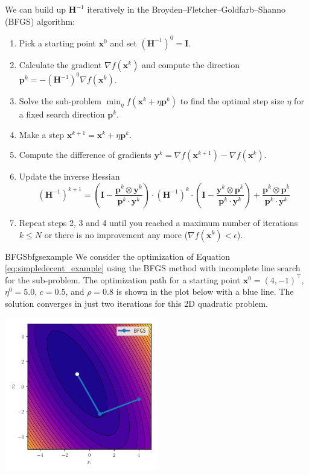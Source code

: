 We can build up $\mathbf{H}^{-1}$ iteratively in the Broyden–Fletcher–Goldfarb–Shanno (BFGS) \cite{Broyden1970, Fletcher1970, Goldfarb1970, Shanno1970} algorithm: 
\begin{enumerate}
    \item Pick a starting point $\mathbf{x}^0$ and set $(\mathbf{H}^{-1})^0=\mathbf{I}$.
    \item Calculate the gradient $\nabla f(\mathbf{x}^k)$ and compute the direction $\mathbf{p}^k = - (\mathbf{H}^{-1})^0 \nabla f(\mathbf{x}^k)$.
    \item Solve the sub-problem $\min_{\eta} f(\mathbf{x}^k + \eta \mathbf{p}^k)$ to find the optimal step size $\eta$ for a fixed search direction $\mathbf{p}^k$.
    \item Make a step $\mathbf{x}^{k+1} = \mathbf{x}^k + \eta \mathbf{p}^k$.
    \item Compute the difference of gradients $ \mathbf{y}^k = \nabla f(\mathbf{x}^{k+1}) - \nabla f(\mathbf{x}^k)$.
    \item Update the inverse Hessian 
    \begin{equation}
        \nonumber
        (\mathbf{H}^{-1})^{k+1} = 
            \left(\mathbf{I} - \frac{\mathbf{p}^k \otimes \mathbf{y}^k}{\mathbf{p}^k \cdot \mathbf{y}^k} \right)
            \cdot
            (\mathbf{H}^{-1})^k
            \cdot
            \left(\mathbf{I} - \frac{\mathbf{y}^k \otimes \mathbf{p}^k}{\mathbf{p}^k \cdot \mathbf{y}^k} \right) 
            + 
            \frac{\mathbf{p}^k \otimes \mathbf{p}^k}{\mathbf{p}^k \cdot \mathbf{y}^k}
    \end{equation}
    \item Repeat steps 2, 3 and 4 until you reached a maximum number of iterations $k \le N$ or there is no improvement any more ($ \nabla f(\mathbf{x}^k) < \epsilon$). 
\end{enumerate}

\begin{example}{BFGS}{bfgsexample}
    We consider the optimization of Equation \eqref{eq:simpledecent_example} using the BFGS method with incomplete line search for the sub-problem. The optimization path for a starting point $\mathbf{x}^0= (4, -1)^\top$, $\eta^0=5.0$, $c=0.5$, and $\rho=0.8$ is shown in the plot below with a blue line. The solution converges in just two iterations for this 2D quadratic problem.
    \begin{center}
        \includegraphics[width=0.5\textwidth]{figures/bfgs.svg}
    \end{center}   
\end{example}



 


